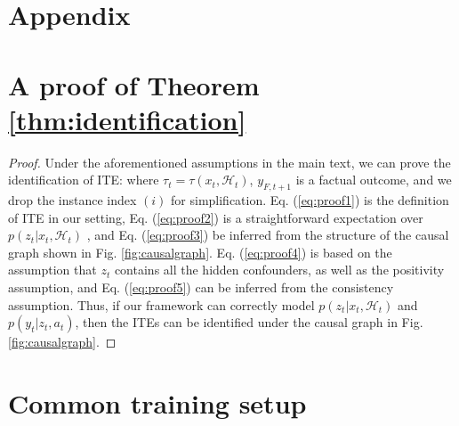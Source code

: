\renewcommand{\thesection}{\Alph{section}}
\section*{Appendix}
\section{A proof of Theorem \ref{thm:identification}}
\label{app:proof}
\begin{proof}
Under the aforementioned assumptions in the main text, we can prove the identification of ITE:
where $\tau_t = \tau(x_t,\mathcal{H}_t)$, $y_{F,t+1}$ is a factual outcome, and we drop the instance index $(i)$ for simplification. 
Eq. (\ref{eq:proof1}) is the definition of ITE in our setting, Eq. (\ref{eq:proof2}) is a straightforward expectation over $p(z_t|x_t,\mathcal{H}_t)$ , and Eq. (\ref{eq:proof3}) be inferred from the structure of the causal graph shown in Fig. \ref{fig:causalgraph}.
Eq. (\ref{eq:proof4}) is based on the assumption that $z_t$ contains all the hidden confounders, as well as the positivity assumption, and Eq. (\ref{eq:proof5}) can be inferred from the consistency assumption. 
Thus, if our framework can correctly model $p(z_t|x_t,\mathcal{H}_t)$ and $p(y_t|z_t,a_t)$, then the ITEs can be identified under the causal graph in Fig. \ref{fig:causalgraph}.
\end{proof}

\section{Common training setup}
\label{app:common}
